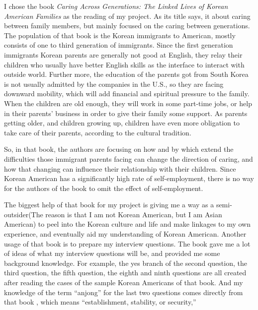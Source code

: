 I chose the book \emph{Caring Across Generations: The Linked Lives of Korean
American Families} as the reading of my project. As its title says, it about
caring between family members, but mainly focused on the caring between
generations. The population of that book is the Korean immigrants to American,
mostly consists of one to third generation of immigrants. Since the first
generation immigrants Korean parents are generally not good at English, they
relay their children who usually have better English skills as the interface to
interact with outside world. Further more, the education of the parents got from
South Korea is not usually admitted by the companies in the U.S., so they are
facing downward mobility, which will add financial and spiritual pressure to the
family. When the children are old enough, they will work in some part-time jobs,
or help in their parents' business in order to give their family some support.
As parents getting older, and children growing up, children have even more
obligation to take care of their parents, according to the cultural tradition.
\par
So, in that book, the authors are focusing on how and by which extend the
difficulties those immigrant parents facing can change the direction of
caring, and how that changing can influence their relationship with their
children. Since Korean American has a significantly high rate of
self-employment, there is no way for the authors of the book to omit the effect
of self-employment.
\par
The biggest help of that book for my project is giving me a way as a
semi-outsider(The reason is that I am not Korean American, but I am Asian
American) to peel into the Korean culture and life and make linkages to my own
experience, and eventually aid my understanding of Korean American. Another
usage of that book is to prepare my interview questions. The book gave me a lot
of ideas of what my interview questions will be, and provided me some background
knowledge. For example, the yes branch of the second question, the third
question, the fifth question, the eighth and ninth questions are all created
after reading the cases of the sample Korean Americans of that book. And my
knowledge of the term ``anjong'' for the last two questions comes directly from
that book \cite[p.~40, p.~41]{book:ISelected}, which means ``establishment,
stability, or security,''
